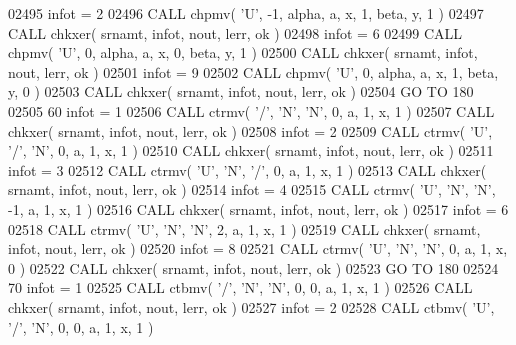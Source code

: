 \begin{DoxyCode}
02495       infot = 2
02496       \textcolor{keyword}{CALL }chpmv( \textcolor{stringliteral}{'U'}, -1, alpha, a, x, 1, beta, y, 1 )
02497       \textcolor{keyword}{CALL }chkxer( srnamt, infot, nout, lerr, ok )
02498       infot = 6
02499       \textcolor{keyword}{CALL }chpmv( \textcolor{stringliteral}{'U'}, 0, alpha, a, x, 0, beta, y, 1 )
02500       \textcolor{keyword}{CALL }chkxer( srnamt, infot, nout, lerr, ok )
02501       infot = 9
02502       \textcolor{keyword}{CALL }chpmv( \textcolor{stringliteral}{'U'}, 0, alpha, a, x, 1, beta, y, 0 )
02503       \textcolor{keyword}{CALL }chkxer( srnamt, infot, nout, lerr, ok )
02504       \textcolor{keywordflow}{GO TO} 180
02505    60 infot = 1
02506       \textcolor{keyword}{CALL }ctrmv( \textcolor{stringliteral}{'/'}, \textcolor{stringliteral}{'N'}, \textcolor{stringliteral}{'N'}, 0, a, 1, x, 1 )
02507       \textcolor{keyword}{CALL }chkxer( srnamt, infot, nout, lerr, ok )
02508       infot = 2
02509       \textcolor{keyword}{CALL }ctrmv( \textcolor{stringliteral}{'U'}, \textcolor{stringliteral}{'/'}, \textcolor{stringliteral}{'N'}, 0, a, 1, x, 1 )
02510       \textcolor{keyword}{CALL }chkxer( srnamt, infot, nout, lerr, ok )
02511       infot = 3
02512       \textcolor{keyword}{CALL }ctrmv( \textcolor{stringliteral}{'U'}, \textcolor{stringliteral}{'N'}, \textcolor{stringliteral}{'/'}, 0, a, 1, x, 1 )
02513       \textcolor{keyword}{CALL }chkxer( srnamt, infot, nout, lerr, ok )
02514       infot = 4
02515       \textcolor{keyword}{CALL }ctrmv( \textcolor{stringliteral}{'U'}, \textcolor{stringliteral}{'N'}, \textcolor{stringliteral}{'N'}, -1, a, 1, x, 1 )
02516       \textcolor{keyword}{CALL }chkxer( srnamt, infot, nout, lerr, ok )
02517       infot = 6
02518       \textcolor{keyword}{CALL }ctrmv( \textcolor{stringliteral}{'U'}, \textcolor{stringliteral}{'N'}, \textcolor{stringliteral}{'N'}, 2, a, 1, x, 1 )
02519       \textcolor{keyword}{CALL }chkxer( srnamt, infot, nout, lerr, ok )
02520       infot = 8
02521       \textcolor{keyword}{CALL }ctrmv( \textcolor{stringliteral}{'U'}, \textcolor{stringliteral}{'N'}, \textcolor{stringliteral}{'N'}, 0, a, 1, x, 0 )
02522       \textcolor{keyword}{CALL }chkxer( srnamt, infot, nout, lerr, ok )
02523       \textcolor{keywordflow}{GO TO} 180
02524    70 infot = 1
02525       \textcolor{keyword}{CALL }ctbmv( \textcolor{stringliteral}{'/'}, \textcolor{stringliteral}{'N'}, \textcolor{stringliteral}{'N'}, 0, 0, a, 1, x, 1 )
02526       \textcolor{keyword}{CALL }chkxer( srnamt, infot, nout, lerr, ok )
02527       infot = 2
02528       \textcolor{keyword}{CALL }ctbmv( \textcolor{stringliteral}{'U'}, \textcolor{stringliteral}{'/'}, \textcolor{stringliteral}{'N'}, 0, 0, a, 1, x, 1 )

\end{DoxyCode}
